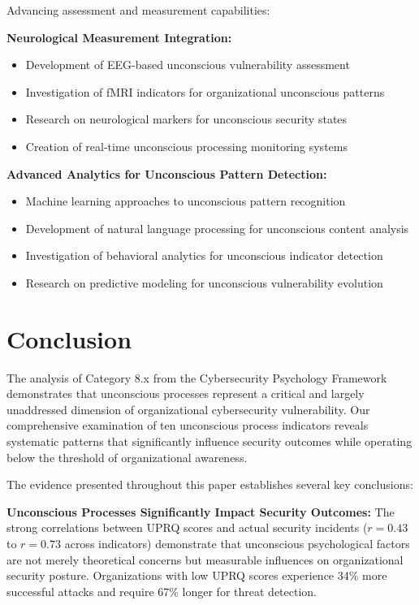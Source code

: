 \documentclass[11pt,a4paper]{article}
\begin{document}
Advancing assessment and measurement capabilities:

\textbf{Neurological Measurement Integration:}
\begin{itemize}
\item Development of EEG-based unconscious vulnerability assessment
\item Investigation of fMRI indicators for organizational unconscious patterns
\item Research on neurological markers for unconscious security states
\item Creation of real-time unconscious processing monitoring systems
\end{itemize}

\textbf{Advanced Analytics for Unconscious Pattern Detection:}
\begin{itemize}
\item Machine learning approaches to unconscious pattern recognition
\item Development of natural language processing for unconscious content analysis
\item Investigation of behavioral analytics for unconscious indicator detection
\item Research on predictive modeling for unconscious vulnerability evolution
\end{itemize}

\section{Conclusion}

The analysis of Category 8.x from the Cybersecurity Psychology Framework demonstrates that unconscious processes represent a critical and largely unaddressed dimension of organizational cybersecurity vulnerability. Our comprehensive examination of ten unconscious process indicators reveals systematic patterns that significantly influence security outcomes while operating below the threshold of organizational awareness.

The evidence presented throughout this paper establishes several key conclusions:

\textbf{Unconscious Processes Significantly Impact Security Outcomes:} The strong correlations between UPRQ scores and actual security incidents ($r = 0.43$ to $r = 0.73$ across indicators) demonstrate that unconscious psychological factors are not merely theoretical concerns but measurable influences on organizational security posture. Organizations with low UPRQ scores experience 34\% more successful attacks and require 67\% longer for threat detection.
\end{document}
